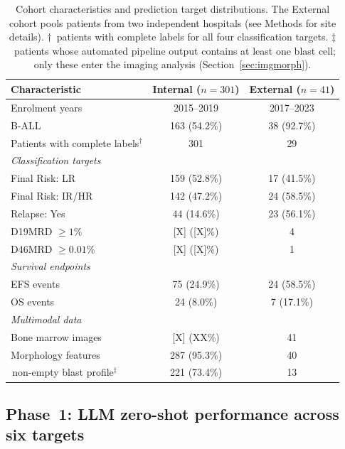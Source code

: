 \documentclass[pdflatex,sn-nature]{sn-jnl}
\begin{document}
\begin{table}[ht]
\caption{Cohort characteristics and prediction target distributions.
The External cohort pools patients from two independent hospitals
(see Methods for site details).
$\dagger$~patients with complete labels
for all four classification targets.
$\ddagger$~patients whose automated pipeline output contains at least
one blast cell; only these enter the imaging analysis
(Section~\ref{sec:imgmorph}).}
\label{tab:cohort}
\centering
\small
\begin{tabular}{lcc}
\toprule
\textbf{Characteristic}
  & \textbf{Internal} ($n=301$)
  & \textbf{External} ($n=41$) \\
\midrule
Enrolment years & 2015--2019 & 2017--2023 \\
B-ALL & 163 (54.2\%) & 38 (92.7\%) \\
Patients with complete labels$^\dagger$ & 301 & 29 \\
\midrule
\multicolumn{3}{l}{\textit{Classification targets}} \\
Final Risk: LR & 159 (52.8\%) & 17 (41.5\%) \\
Final Risk: IR/HR & 142 (47.2\%) & 24 (58.5\%) \\
Relapse: Yes & 44 (14.6\%) & 23 (56.1\%) \\
D19MRD $\geq 1\%$ & [X] ([X]\%) & 4 \\
D46MRD $\geq 0.01\%$ & [X] ([X]\%) & 1 \\
\midrule
\multicolumn{3}{l}{\textit{Survival endpoints}} \\
EFS events & 75 (24.9\%) & 24 (58.5\%) \\
OS events & 24 (8.0\%) & 7 (17.1\%) \\
\midrule
\multicolumn{3}{l}{\textit{Multimodal data}} \\
Bone marrow images & [X] (XX\%) & 41 \\
Morphology features & 287 (95.3\%) & 40 \\
\;\,non-empty blast profile$^\ddagger$ & 221 (73.4\%) & 13 \\
\bottomrule
\end{tabular}
\end{table}

\subsection{Phase~1: LLM zero-shot performance across six targets}
\label{sec:phase1}
\end{document}
